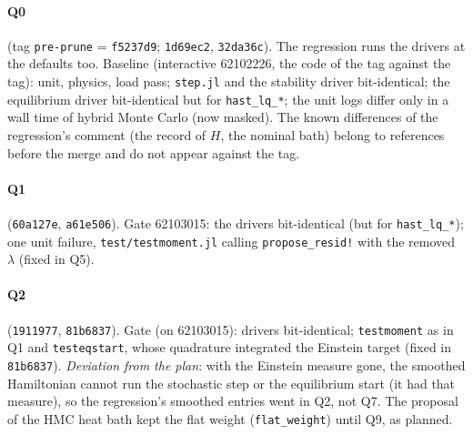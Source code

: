 \documentclass[11pt,aps,preprint,nofootinbib,superscriptaddress,tightenlines]{revtex4-2}
\let\oldparagraph\paragraph
\renewcommand{\paragraph}{\par\bigskip\oldparagraph}
\begin{document}
\paragraph{Q0} (tag \texttt{pre-prune} = \texttt{f5237d9}; \texttt{1d69ec2}, \texttt{32da36c}).  The regression runs the drivers at the
defaults too.  Baseline (interactive 62102226, the code of the tag against the tag): unit, physics, load pass; \texttt{step.jl} and the
stability driver bit-identical; the equilibrium driver bit-identical but for \texttt{hast\_lq\_*}; the unit logs differ only in a wall
time of hybrid Monte Carlo (now masked).  The known differences of the regression's comment (the record of $H$, the nominal bath)
belong to references before the merge and do not appear against the tag.

\paragraph{Q1} (\texttt{60a127e}, \texttt{a61e506}).  Gate 62103015: the drivers bit-identical (but for \texttt{hast\_lq\_*}); one unit
failure, \nolinkurl{test/testmoment.jl} calling \texttt{propose\_resid!} with the removed $\lambda$ (fixed in Q5).

\paragraph{Q2} (\texttt{1911977}, \texttt{81b6837}).  Gate (on 62103015): drivers bit-identical; \texttt{testmoment} as in Q1 and
\texttt{testeqstart}, whose quadrature integrated the Einstein target (fixed in \texttt{81b6837}).  \emph{Deviation from the plan}: with
the Einstein measure gone, the smoothed Hamiltonian cannot run the stochastic step or the equilibrium start (it had that measure), so
the regression's smoothed entries went in Q2, not Q7.  The proposal of the HMC heat bath kept the flat weight (\texttt{flat\_weight})
until Q9, as planned.
\end{document}
